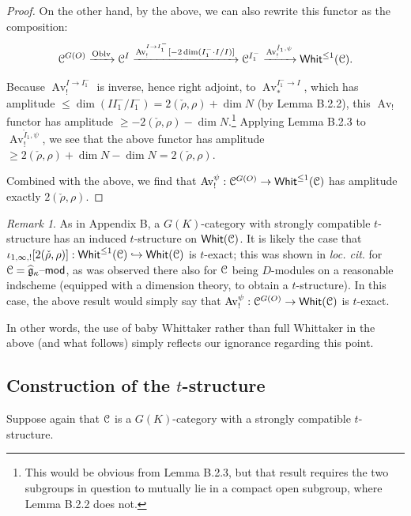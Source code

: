 \documentclass[reqno,11pt]{amsart}
\numberwithin{equation}{subsection}
\theoremstyle{remark}
\newtheorem{rem}[thm]{Remark}
\newcommand{\xar}[1]{\xrightarrow{#1}}
\newcommand{\into}{\hookrightarrow}
\newcommand{\sC}{{\EuScript C}}
\newcommand{\fg}{{\mathfrak g}}
\newcommand{\on}{\operatorname}
\newcommand{\mathendash}{\text{\textendash}}
\newcommand{\Whit}{\mathsf{Whit}}
\renewcommand{\mod}{\mathendash\mathsf{mod}}
\newcommand{\Oblv}{\on{Oblv}}
\newcommand{\Av}{\on{Av}}
\renewcommand{\o}[1]{\mathring{#1}}
\begin{document}
\begin{proof}
On the other hand, by the above, we can also rewrite this functor as 
the composition:
%
\[
\sC^{G(O)} \xar{\Oblv} \sC^{I} \xar{\Av_!^{I \to I_1^-}[-2\dim (I_1^-\cdot I/I)]} 
\sC^{I_1^-} \xar{\Av_!^{\o{I}_1,\psi}} \Whit^{\leq 1}(\sC).
\]

\noindent Because $\Av_!^{I \to I_1^-}$ is 
inverse, hence right adjoint, to $\Av_*^{I_1^- \to I}$, which 
has amplitude $\leq \dim (I I_1^-/I_1^-) = 2(\check{\rho},\rho)+\dim N$ 
(by \cite{whit} Lemma B.2.2),
this $\Av_!$ functor has amplitude $\geq -2(\check{\rho},\rho)-\dim N$.\footnote{This
would be obvious from \cite{whit} Lemma B.2.3, but that result requires
the two subgroups in question to mutually lie in a compact open subgroup,
where \cite{whit} Lemma B.2.2 does not.} 
Applying \cite{whit} Lemma B.2.3 to $\Av_!^{\o{I}_1,\psi}$, we see
that the above functor has amplitude $\geq 2(\check{\rho},\rho)+\dim N-\dim N = 
2(\check{\rho},\rho)$. 

Combined with the above, we find that $\Av_!^{\psi}:\sC^{G(O)} \to \Whit^{\leq 1}(\sC)$
has amplitude exactly $2(\check{\rho},\rho)$.

\end{proof}

\begin{rem}

As in \cite{whit} Appendix B, a $G(K)$-category with strongly compatible
$t$-structure has an induced $t$-structure on $\Whit(\sC)$. It is likely
the case that $\iota_{1,\infty,!}[2(\check{\rho},\rho)]:\Whit^{\leq 1}(\sC) \into \Whit(\sC)$ 
is $t$-exact; this was shown in \emph{loc. cit}. for $\sC = \widehat{\fg}_{\kappa}\mod$,
as was observed there also for $\sC$ being $D$-modules on a reasonable
indscheme (equipped with a dimension theory, to obtain a $t$-structure).
In this case, the above result would simply say that 
$\Av_!^{\psi}: \sC^{G(O)} \to \Whit(\sC)$ is $t$-exact. 

In other words, the use of baby Whittaker rather than full Whittaker 
in the above (and what follows) simply
reflects our ignorance regarding this point.

\end{rem}


\subsection{Construction of the $t$-structure}

Suppose again that $\sC$ is a $G(K)$-category with a strongly compatible 
$t$-structure. 
\end{document}

